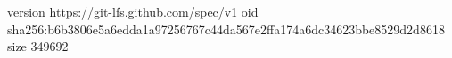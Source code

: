version https://git-lfs.github.com/spec/v1
oid sha256:b6b3806e5a6edda1a97256767c44da567e2ffa174a6dc34623bbe8529d2d8618
size 349692
